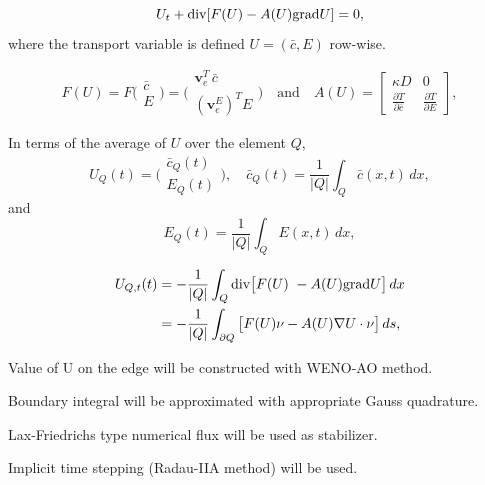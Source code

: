 \documentclass[usenames,dvipsnames,letterpaper,landscape,final]{slides}
\renewcommand{\d}{\partial}
\def\grad{\nabla}
\def\twoVec(#1,#2){\bigg(\begin{matrix}#1\\#2\end{matrix}\bigg)}
\def\d{\partial}
\def\grad{\nabla}
\def\Div{\text{\rm div}}
\def\v{\mathbf{v}}
\begin{document}
\begin{myslideNoFooter}
		  \begin{equation*}
	U_t + \Div[ F(U) - A(U)\Grad U ] = 0,
\end{equation*}
where the transport variable is defined $U=(\bar c,E)$ row-wise. 

\bigskip
{}
\begin{equation*}
F(U) = F\twoVec(\bar c,E) = \twoVec({\v_e^T\,\bar c},{(\v_e^E)^T E})
\quad\text{and}\quad
A(U) = \left[\begin{matrix}
\kappa D&0\\
\frac{\d T}{\d\bar c}&\frac{\d T}{\d E}
\end{matrix}\right],
\end{equation*}
	
In terms of the average of $U$ over the element $Q$,
\begin{equation*}
    U_Q(t) = \twoVec({\bar{c}_Q(t)} , {E_Q(t)}),
    \quad
    \bar{c}_Q(t) = \frac{1}{|Q|}\int_Q \bar c(x,t)\,dx,
\end{equation*}
and
\begin{equation*}
    E_Q(t) = \frac{1}{|Q|}\int_Q E(x,t)\,dx,
\end{equation*}

\end{myslideNoFooter}

\begin{myslideNoFooter}
		  \begin{equation*}
					 \begin{aligned}
								U_{Q,t}(t) &= -\frac{1}{|Q|}\int_Q\Div\big[F(U)\ - A(U)\Grad U\big]\,dx\\
								&= -\frac{1}{|Q|}\int_{\d Q}\big[F(U)\nu - A(U)\grad U\cdot\nu\big]\,ds,
					 \end{aligned}
\end{equation*}

		  \begin{blist}
		  \item Value of U on the edge will be constructed with WENO-AO method.
		  \item Boundary integral will be approximated with appropriate Gauss quadrature.
		  \item Lax-Friedrichs type numerical flux will be used as stabilizer.
		  \item Implicit time stepping (Radau-IIA method) will be used.
		  \end{blist}
\end{myslideNoFooter}
\end{document}

